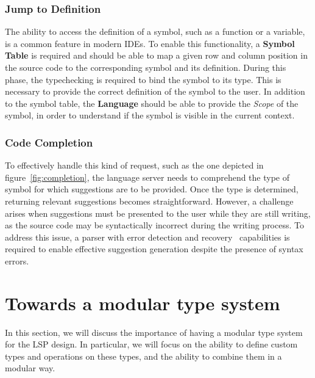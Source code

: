 \subsubsection{Jump to Definition}\label{subsubsec:concept:JumpToDefinition}
The ability to access the definition of a symbol, such as a function or a variable, is a common feature in modern IDEs.
To enable this functionality, a \textbf{Symbol Table} is required and should be able to map a given row and column position in the source code to the corresponding symbol and its definition.
During this phase, the typechecking is required to bind the symbol to its type. This is necessary to provide the correct definition of the symbol to the user.
In addition to the symbol table, the \textbf{Language} should be able to provide the \textit{Scope} of the symbol, in order to understand if the symbol is visible in the current context.

\subsubsection{Code Completion}\label{subsubsec:concept:CodeCompletion}

To effectively handle this kind of request, such as the one depicted in figure~\ref{fig:completion}, the language server needs to comprehend the type of symbol for which suggestions are to be provided. Once the type is determined, returning relevant suggestions becomes straightforward. However, a challenge arises when suggestions must be presented to the user while they are still writing, as the source code may be syntactically incorrect during the writing process. To address this issue, a parser with error detection and recovery~\cite{Graham79} capabilities is required to enable effective suggestion generation despite the presence of syntax errors.

\section{Towards a modular type system}\label{sec:concept:TowardsAModularTypeSystem}

In this section, we will discuss the importance of having a modular type system for the LSP design. In particular, we will focus on the ability to define custom types and operations on these types, and the ability to combine them in a modular way.

